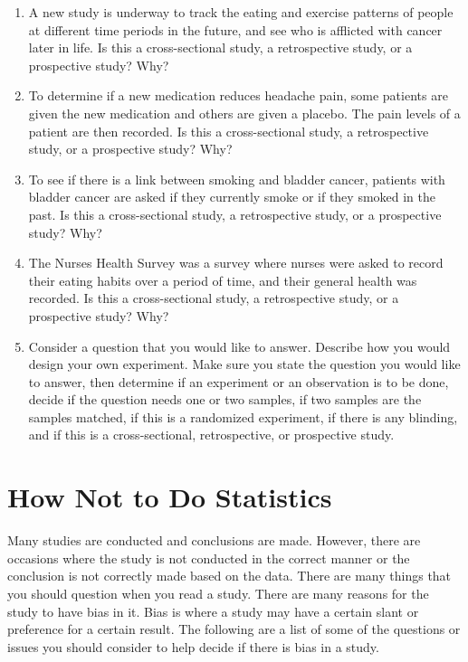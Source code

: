 \documentclass[]{book}
\begin{document}
\begin{enumerate}
\item
  A new study is underway to track the eating and exercise patterns of people at different time periods in the future, and see who is afflicted with cancer later in life. Is this a cross-sectional study, a retrospective study, or a prospective study? Why?
\item
  To determine if a new medication reduces headache pain, some patients are given the new medication and others are given a placebo. The pain levels of a patient are then recorded. Is this a cross-sectional study, a retrospective study, or a prospective study? Why?
\item
  To see if there is a link between smoking and bladder cancer, patients with bladder cancer are asked if they currently smoke or if they smoked in the past. Is this a cross-sectional study, a retrospective study, or a prospective study? Why?
\item
  The Nurses Health Survey was a survey where nurses were asked to record their eating habits over a period of time, and their general health was recorded. Is this a cross-sectional study, a retrospective study, or a prospective study? Why?
\item
  Consider a question that you would like to answer. Describe how you would design your own experiment. Make sure you state the question you would like to answer, then determine if an experiment or an observation is to be done, decide if the question needs one or two samples, if two samples are the samples matched, if this is a randomized experiment, if there is any blinding, and if this is a cross-sectional, retrospective, or prospective study.
  \textbf{\\
  }
\end{enumerate}

\hypertarget{how-not-to-do-statistics}{%
\section{How Not to Do Statistics}\label{how-not-to-do-statistics}}

Many studies are conducted and conclusions are made. However, there are occasions where the study is not conducted in the correct manner or the conclusion is not correctly made based on the data. There are many things that you should question when you read a study. There are many reasons for the study to have bias in it. Bias is where a study may have a certain slant or preference for a certain result. The following are a list of some of the questions or issues you should consider to help decide if there is bias in a study.
\end{document}

